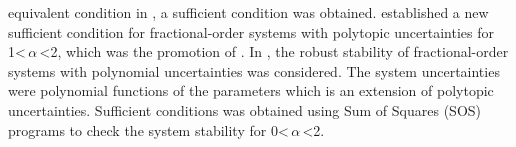 \documentclass[]{interact}
\theoremstyle{plain}%
\theoremstyle{definition}
\theoremstyle{remark}
\begin{document}
equivalent condition in \cite{Far2010}, a sufficient condition was obtained. \cite{Yang2018} established a new sufficient condition for fractional-order systems with polytopic uncertainties for 1\textless\,$\alpha$\,\textless2, which was the promotion of \cite{Lu2013b}. In \cite{Zheng2020}, the robust stability of fractional-order systems with polynomial uncertainties was considered. The system uncertainties were polynomial functions of the parameters which is an extension of polytopic uncertainties. Sufficient conditions was obtained using Sum of Squares (SOS) programs to check the system stability for 0\textless\,$\alpha$\,\textless2.


\end{document}
